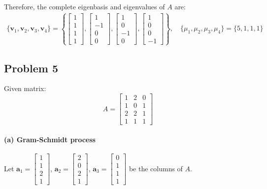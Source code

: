 Therefore, the complete eigenbasis and eigenvalues of $A$ are:
\begin{align*}
    \{\mathbf{\mathbf{v}}_1, \mathbf{\mathbf{v}}_2, \mathbf{\mathbf{v}}_3, \mathbf{\mathbf{v}}_4\} = \left\{\begin{bmatrix} 1 \\ 1 \\ 1 \\ 1 \end{bmatrix}, \begin{bmatrix} 1 \\ -1 \\ 0 \\ 0 \end{bmatrix}, \begin{bmatrix} 1 \\ 0 \\ -1 \\ 0 \end{bmatrix}, \begin{bmatrix} 1 \\ 0 \\ 0 \\ -1 \end{bmatrix}\right\},
    \quad
    \{\mu_1, \mu_2, \mu_3, \mu_4\} = \{5, 1, 1, 1\}
\end{align*}

\subsection{Problem 5}

Given matrix:
\[
    A = \begin{bmatrix}
        1 & 2 & 0 \\
        1 & 0 & 1 \\
        2 & 2 & 1 \\
        1 & 1 & 1
    \end{bmatrix}
\]

\paragraph*{(a) Gram-Schmidt process}

Let $\mathbf{a}_1 = \begin{bmatrix} 1 \\ 1 \\ 2 \\ 1 \end{bmatrix}$, $\mathbf{a}_2 = \begin{bmatrix} 2 \\ 0 \\ 2 \\ 1 \end{bmatrix}$, $\mathbf{a}_3 = \begin{bmatrix} 0 \\ 1 \\ 1 \\ 1 \end{bmatrix}$ be the columns of $A$.

